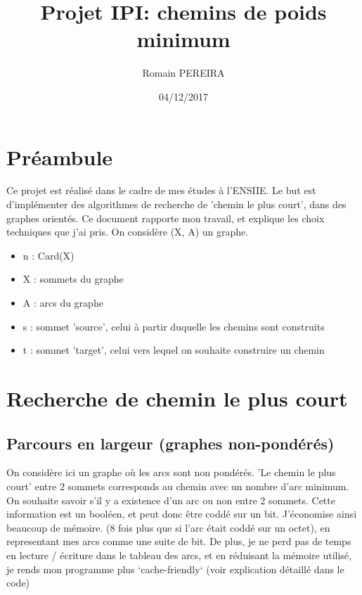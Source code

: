 \documentclass[a4paper,10pt]{article}
\title{Projet IPI: chemins de poids minimum}
\author{Romain PEREIRA}
\date{04/12/2017}
\begin{document}
  \maketitle
  \tableofcontents

  \section*{Préambule}
    Ce projet est réalisé dans le cadre de mes études à l'ENSIIE.\newline
    Le but est d'implémenter des algorithmes de recherche de 'chemin le plus court', dans des graphes orientés.\newline
    Ce document rapporte mon travail, et explique les choix techniques que j'ai pris.\newline\newline
    On considère (X, A) un graphe.
    \begin{itemize}[label=-]
      \item n : Card(X)
      \item X : sommets du graphe
      \item A : arcs du graphe
      \item s : sommet 'source', celui à partir duquelle les chemins sont construits
      \item t : sommet 'target', celui vers lequel on souhaite construire un chemin
    \end{itemize}
    
  \newpage
  \section{Recherche de chemin le plus court}
  \subsection{Parcours en largeur (graphes non-pondérés)}
    On considère ici un graphe où les arcs sont non pondérés.\newline
    'Le chemin le plus court' entre 2 sommets corresponds au chemin avec un nombre d'arc minimum.\newline
    On souhaite savoir s'il y a existence d'un arc ou non entre 2 sommets. Cette information est un booléen, et peut donc être coddé sur un bit.
    J'économise ainsi beaucoup de mémoire. (8 fois plus que si l'arc était coddé sur un octet), en representant mes arcs comme une suite de bit.
    De plus, je ne perd pas de temps en lecture / écriture dans le tableau des arcs,
    et en réduisant la mémoire utilisé, je rends mon programme plus `cache-friendly` (voir explication détaillé dans le code)
\end{document}
